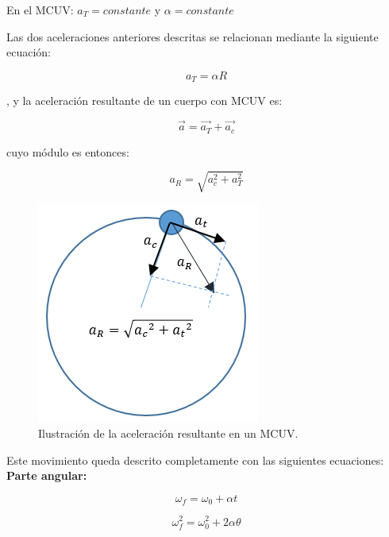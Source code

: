 \begin{tcolorbox}
En el MCUV: $a_T = constante$ y $\alpha = constante$
\end{tcolorbox}

Las dos aceleraciones anteriores descritas se relacionan mediante la siguiente ecuación:

\begin{equation}
a_T = \alpha R
\end{equation} 

, y la aceleración resultante de un cuerpo con MCUV es:

\begin{equation}
\vec{a} = \vec{a_T}+\vec{a_c}
\end{equation}

cuyo módulo es entonces:

\begin{equation}
a_R =\sqrt{a_c^2+a_T^2} 
\end{equation}

\begin{figure}[ht]
 \centering
 \includegraphics[scale=0.5]{images/aceleracion-resultante.png}
 \caption{Ilustración de la aceleración resultante en un MCUV.}\label{ac}
\end{figure} 
 
Este movimiento queda descrito completamente con las siguientes ecuaciones:\\

\textbf{Parte angular:}

\begin{equation}
\omega_f = \omega_0 + \alpha t
\end{equation}

\begin{equation}
\omega_f^2 = \omega_0^2 + 2\alpha\theta
\end{equation}

